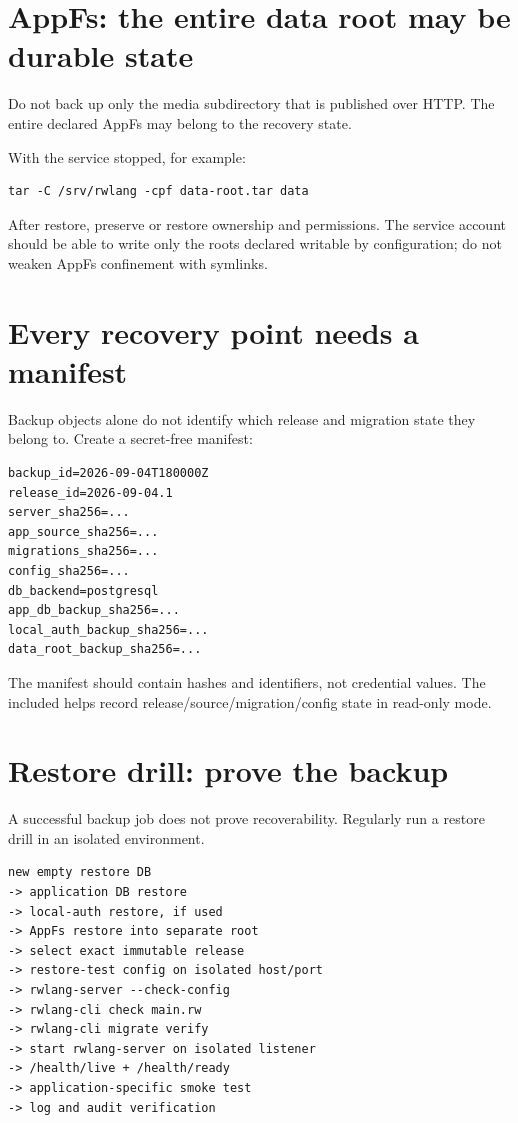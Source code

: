 \section{AppFs: the entire data root may be durable state}

Do not back up only the media subdirectory that is published over HTTP. The entire declared AppFs  may belong to the recovery state.

With the service stopped, for example:

\begin{lstlisting}
tar -C /srv/rwlang -cpf data-root.tar data
\end{lstlisting}

After restore, preserve or restore ownership and permissions. The service account should be able to write only the roots declared writable by configuration; do not weaken AppFs confinement with symlinks.

\section{Every recovery point needs a manifest}

Backup objects alone do not identify which release and migration state they belong to. Create a secret-free manifest:

\begin{lstlisting}
backup_id=2026-09-04T180000Z
release_id=2026-09-04.1
server_sha256=...
app_source_sha256=...
migrations_sha256=...
config_sha256=...
db_backend=postgresql
app_db_backup_sha256=...
local_auth_backup_sha256=...
data_root_backup_sha256=...
\end{lstlisting}

The manifest should contain hashes and identifiers, not credential values. The included  helps record release/source/migration/config state in read-only mode.

\section{Restore drill: prove the backup}

A successful backup job does not prove recoverability. Regularly run a restore drill in an isolated environment.

\begin{lstlisting}
new empty restore DB
-> application DB restore
-> local-auth restore, if used
-> AppFs restore into separate root
-> select exact immutable release
-> restore-test config on isolated host/port
-> rwlang-server --check-config
-> rwlang-cli check main.rw
-> rwlang-cli migrate verify
-> start rwlang-server on isolated listener
-> /health/live + /health/ready
-> application-specific smoke test
-> log and audit verification
\end{lstlisting}

